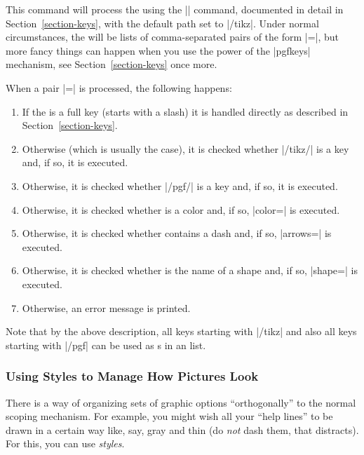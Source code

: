 \begin{command}{\tikzset{}}
    This command will process the  using the |\pgfkeys| command,
    documented in detail in Section~\ref{section-keys}, with the default path
    set to |/tikz|. Under normal circumstances, the  will be
    lists of comma-separated pairs of the form |=|, but
    more fancy things can happen when you use the power of the |pgfkeys|
    mechanism, see Section~\ref{section-keys} once more.

    When a pair |=| is processed, the following happens:
    \begin{enumerate}
        \item If the  is a full key (starts with a slash) it is
            handled directly as described in Section~\ref{section-keys}.
        \item Otherwise (which is usually the case), it is checked whether
            |/tikz/| is a key and, if so, it is executed.
        \item Otherwise, it is checked whether |/pgf/| is a key
            and, if so, it is executed.
        \item Otherwise, it is checked whether  is a color and, if
            so, |color=| is executed.
        \item Otherwise, it is checked whether  contains a dash
            and, if so, |arrows=| is executed.
        \item Otherwise, it is checked whether  is the name of a
            shape and, if so, |shape=| is executed.
        \item Otherwise, an error message is printed.
    \end{enumerate}

    Note that by the above description, all keys starting with |/tikz| and also
    all keys starting with |/pgf| can be used as s in an
     list.
\end{command}


\subsubsection{Using Styles to Manage How Pictures Look}

There is a way of organizing sets of graphic options ``orthogonally'' to the
normal scoping mechanism. For example, you might wish all your ``help lines''
to be drawn in a certain way like, say, gray and thin (do \emph{not} dash them,
that distracts). For this, you can use \emph{styles}.

